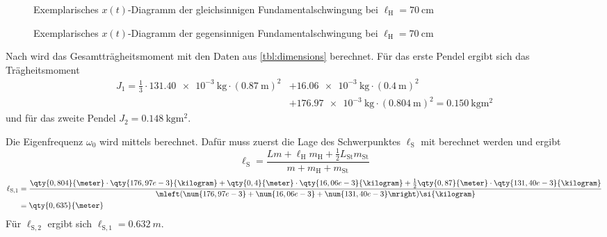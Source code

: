 \documentclass[
12pt,
a4paper,
bibliography=totocnumbered, %
twoside, %
BCOR=1cm, %
]{scrartcl}
\newcommand{\lh}{\ell_{\mathrm{H}}}
\newcommand{\ls}{\ell_{\mathrm{S}}}
\begin{document}
\begin{figure}[H]
	\caption{Exemplarisches \(x(t)\)-Diagramm der gleichsinnigen Fundamentalschwingung bei \(\lh = \qty{70}{\centi\meter}\)}
	\label{fig:gl70}
\end{figure}

\begin{figure}[H]
	\caption{Exemplarisches \(x(t)\)-Diagramm der gegensinnigen Fundamentalschwingung bei \(\lh = \qty{70}{\centi\meter}\)}
	\label{fig:geg70}
\end{figure}


%
%
%

Nach %
wird das Gesamtträgheitsmoment mit den Daten aus \autoref{tbl:dimensions} berechnet. Für das erste Pendel ergibt sich das Trägheitsmoment
\begin{equation}
	\begin{split}
		J_1 = \frac{1}{3} \cdot \qty{131,40e-3}{\kilogram} \cdot (\qty{0,87}{\meter})^2 &+ \qty{16,06e-3}{\kilogram} \cdot (\qty{0,4}{\meter})^2
		\\&+ \qty{176,97e-3}{\kilogram} \cdot (\qty{0,804}{\meter})^2 = \qty{0,150}{\kilogram\meter\squared}
	\end{split}
\end{equation}
und für das zweite Pendel \(J_2 = \qty{0,148}{\kilogram\meter\squared}\).

Die Eigenfrequenz \(\omega_0\) wird mittels %
berechnet. Dafür muss zuerst die Lage des Schwerpunktes \(\ls\) mit %
berechnet werden und ergibt
\begin{equation}
	\ls = \frac{Lm + \lh m_{\text{H}} + \tfrac{1}{2} L_{\text{St}} m_{\text{St}}}{m + m_{\text{H}} + m_{\text{St}}}
\end{equation}
\begin{equation}
	\begin{split}
		\ell_{\text{S},1} &= \frac{\qty{0,804}{\meter} \cdot \qty{176,97e-3}{\kilogram} + \qty{0,4}{\meter} \cdot \qty{16,06e-3}{\kilogram} + \tfrac{1}{2}\qty{0,87}{\meter} \cdot \qty{131,40e-3}{\kilogram}}{\mleft(\num{176,97e-3} + \num{16,06e-3} + \num{131,40e-3}\mright)\si{\kilogram}}\\
		&= \qty{0,635}{\meter}
	\end{split}
\end{equation}
Für \(\ell_{\text{S},2}\) ergibt sich \(\ell_{\text{S},1} = \qty{0,632}{m}\).
\end{document}
